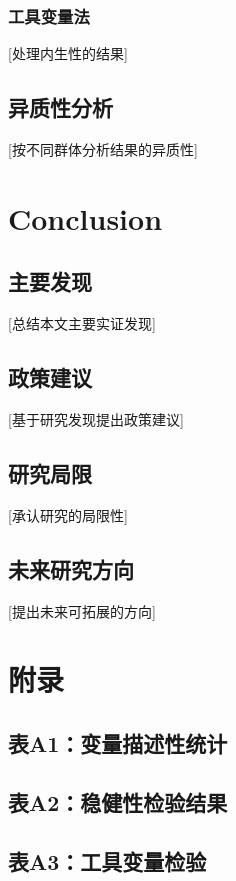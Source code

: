 \documentclass[a4paper,12pt]{article}
\numberwithin{equation}{section}
\begin{document}
\subsubsection{工具变量法}
[处理内生性的结果]

\subsection{异质性分析}
[按不同群体分析结果的异质性]

\section{Conclusion}
\label{sec:concl}

\subsection{主要发现}
[总结本文主要实证发现]

\subsection{政策建议}
[基于研究发现提出政策建议]

\subsection{研究局限}
[承认研究的局限性]

\subsection{未来研究方向}
[提出未来可拓展的方向]

\newpage


\newpage
\appendix
\section*{附录}

\subsection{表A1：变量描述性统计}

\subsection{表A2：稳健性检验结果}

\subsection{表A3：工具变量检验}
\end{document}
